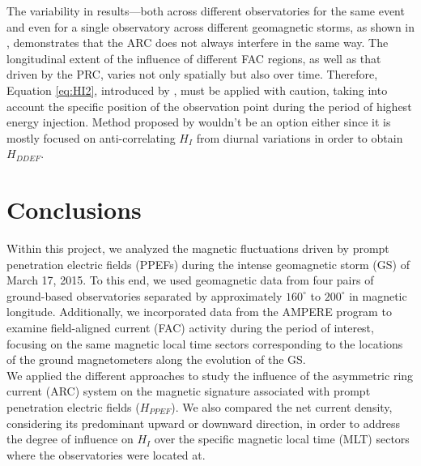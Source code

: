 \documentclass[a4paper]{article}
\theoremstyle{plain}
\theoremstyle{definition}
\begin{document}
	
	The variability in results—both across different observatories for the same event and even for a single observatory across different geomagnetic storms, as shown in \cite{CASTELLANOSVELAZCO2024}, demonstrates that the ARC does not always interfere in the same way. The longitudinal extent of the influence of different FAC regions, as well as that driven by the PRC, varies not only spatially but also over time. Therefore, Equation \ref{eq:HI2}, introduced by \cite{amory2020_filtros}, must be applied with caution, taking into account the specific position of the observation point during the period of highest energy injection. Method proposed by \cite{amory_younas2021} wouldn't be an option either since it is mostly focused on anti-correlating $H_I$ from diurnal variations in order to obtain $H_{DDEF}$.\\
	
	
	
	\section{Conclusions}
	
	Within this project, we analyzed the magnetic fluctuations driven by prompt penetration electric fields (PPEFs) during the intense geomagnetic storm (GS) of March 17, 2015. To this end, we used geomagnetic data from four pairs of ground-based observatories separated by approximately $160^\circ$ to $200^\circ$ in magnetic longitude. Additionally, we incorporated data from the AMPERE program to examine field-aligned current (FAC) activity during the period of interest, focusing on the same magnetic local time sectors corresponding to the locations of the ground magnetometers along the evolution of the GS.\\
	
	We applied the different approaches to study the influence of the asymmetric ring current (ARC) system on the magnetic signature associated with prompt penetration electric fields ($H_{PPEF}$). We also compared the net current density, considering its predominant upward or downward direction, in order to address the degree of influence on $H_I$ over the specific magnetic local time (MLT) sectors where the observatories were located at.\\
	
\end{document}

